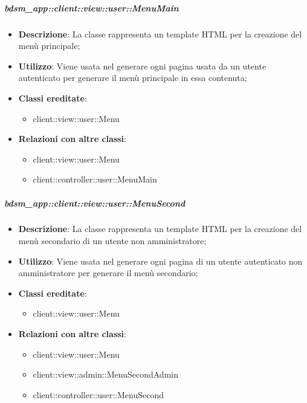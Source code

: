 		\subparagraph{bdsm\_app::client::view::user::MenuMain} %
		\label{subp:bdsm_app_client_view_user_menumain}
			\begin{itemize}
				\item \textbf{Descrizione}: La classe rappresenta un template HTML per la creazione del menù principale;
				\item \textbf{Utilizzo}: Viene usata nel generare ogni pagina usata da un utente autenticato per generare il menù principale in essa contenuta;
				\item \textbf{Classi ereditate}: 
					\begin{itemize}
						\item client::view::user::Menu						
					\end{itemize}
				\item \textbf{Relazioni con altre classi}: 		
					\begin{itemize}
						\item client::view::user::Menu
						\item client::controller::user::MenuMain							
					\end{itemize}
			\end{itemize}

		\subparagraph{bdsm\_app::client::view::user::MenuSecond} %
		\label{subp:bdsm_app_client_view_user_menusecond}
			\begin{itemize}
				\item \textbf{Descrizione}: La classe rappresenta un template HTML per la creazione del menù secondario di un utente non amministratore;
				\item \textbf{Utilizzo}: Viene usata nel generare ogni pagina di un utente autenticato non amministratore per generare il menù secondario;
				\item \textbf{Classi ereditate}: 				
					\begin{itemize}
						\item client::view::user::Menu						
					\end{itemize}
				\item \textbf{Relazioni con altre classi}: 		
					\begin{itemize}
						\item client::view::user::Menu
						\item client::view::admin::MenuSecondAdmin
						\item client::controller::user::MenuSecond	
					\end{itemize}
			\end{itemize}

